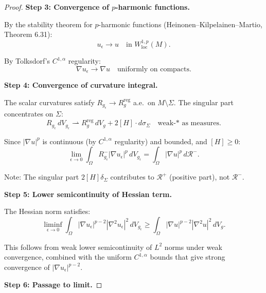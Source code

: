 \begin{proof}
\textbf{Step 3: Convergence of $p$-harmonic functions.}

By the stability theorem for $p$-harmonic functions (Heinonen--Kilpelainen--Martio, Theorem 6.31):
\begin{equation}
    u_\epsilon \to u \quad \text{in } W^{1,p}_{\text{loc}}(M).
\end{equation}

By Tolksdorf's $C^{1,\alpha}$ regularity:
\begin{equation}
    \nabla u_\epsilon \to \nabla u \quad \text{uniformly on compacts}.
\end{equation}

\textbf{Step 4: Convergence of curvature integral.}

The scalar curvatures satisfy $R_{g_\epsilon} \to R_g^{\text{reg}}$ a.e.~on $M \setminus \Sigma$. The singular part concentrates on $\Sigma$:
\begin{equation}
    R_{g_\epsilon} \, dV_{g_\epsilon} \rightharpoonup R_g^{\text{reg}} \, dV_g + 2[H] \cdot d\sigma_\Sigma \quad \text{weak-* as measures}.
\end{equation}

Since $|\nabla u|^p$ is continuous (by $C^{1,\alpha}$ regularity) and bounded, and $[H] \ge 0$:
\begin{equation}
    \lim_{\epsilon \to 0} \int_\Omega R_{g_\epsilon}^- |\nabla u_\epsilon|^p \, dV_{g_\epsilon} = \int_\Omega |\nabla u|^p \, d\mathcal{R}^-.
\end{equation}

Note: The singular part $2[H] \delta_\Sigma$ contributes to $\mathcal{R}^+$ (positive part), not $\mathcal{R}^-$.

\textbf{Step 5: Lower semicontinuity of Hessian term.}

The Hessian norm satisfies:
\begin{equation}
    \liminf_{\epsilon \to 0} \int_\Omega |\nabla u_\epsilon|^{p-2} |\nabla^2 u_\epsilon|^2 \, dV_{g_\epsilon} \ge \int_\Omega |\nabla u|^{p-2} |\nabla^2 u|^2 \, dV_g.
\end{equation}

This follows from weak lower semicontinuity of $L^2$ norms under weak convergence, combined with the uniform $C^{1,\alpha}$ bounds that give strong convergence of $|\nabla u_\epsilon|^{p-2}$.

\textbf{Step 6: Passage to limit.}


\end{proof}
